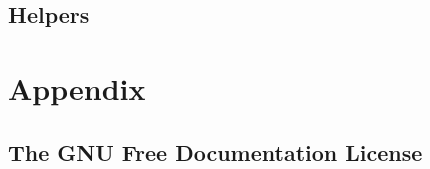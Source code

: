 \chapter{Helpers}
\label{Helpers}
\hypertarget{Helpers}{}


\part{Appendix}

\chapter{The GNU Free Documentation License}
\label{GNUFreeDocumentationLicense}
\hypertarget{GNUFreeDocumentationLicense}{}




